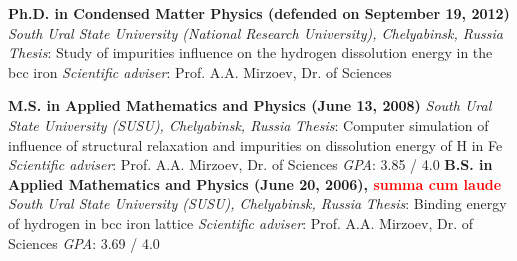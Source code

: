 {\textbf{Ph.D.
in Condensed Matter Physics (defended on September 19, 2012)} \newline
\textit{South Ural State University (National Research University), Chelyabinsk,
Russia} \newline \textit{Thesis}: Study of impurities influence on the hydrogen
dissolution energy in the bcc iron\newline
\textit{Scientific adviser}: Prof. A.A. Mirzoev, Dr. of Sciences\newline
}

{\textbf{M.S.
in Applied Mathematics and Physics (June 13, 2008)} \newline
\textit{South Ural State University (SUSU), Chelyabinsk, Russia} \newline
\textit{Thesis}: Computer simulation of influence of structural relaxation and
impurities on dissolution energy of H in Fe \newline
\textit{Scientific adviser}: Prof. A.A. Mirzoev, Dr. of Sciences\newline
\textit{GPA}: 3.85 / 4.0
}
{\textbf{B.S. in Applied Mathematics and Physics (June 20, 2006),
\textcolor{red}{summa cum laude}} \newline
\textit{South Ural State University (SUSU), Chelyabinsk, Russia} \newline
\textit{Thesis}: Binding energy of hydrogen in bcc iron lattice \newline
\textit{Scientific adviser}: Prof. A.A. Mirzoev, Dr. of Sciences \newline
\textit{GPA}: 3.69 / 4.0
}
